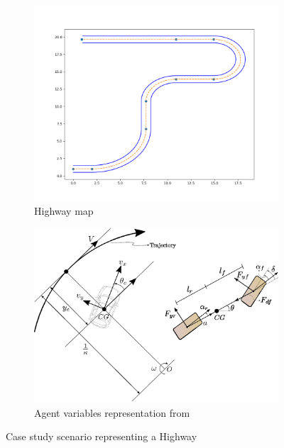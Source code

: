 \documentclass[a4paper,fleqn]{cas-sc}
\begin{document}
\begin{figure}
    \centering
        \begin{subfigure}{0.5\textwidth}
          \centering
          \includegraphics[width=\textwidth]{figs/map.png}
          \caption{Highway map}
          \label{fig:Highway}
        \end{subfigure}%
        \begin{subfigure}{.5\textwidth}
          \centering
          \includegraphics[width=\textwidth]{figs/variables_representation.eps}
          \caption{Agent variables representation from \cite{racingEM}}
          \label{fig:model}
        \end{subfigure}
    \caption{Case study scenario representing a Highway }
    \label{fig:FvC}
\end{figure}
\end{document}
